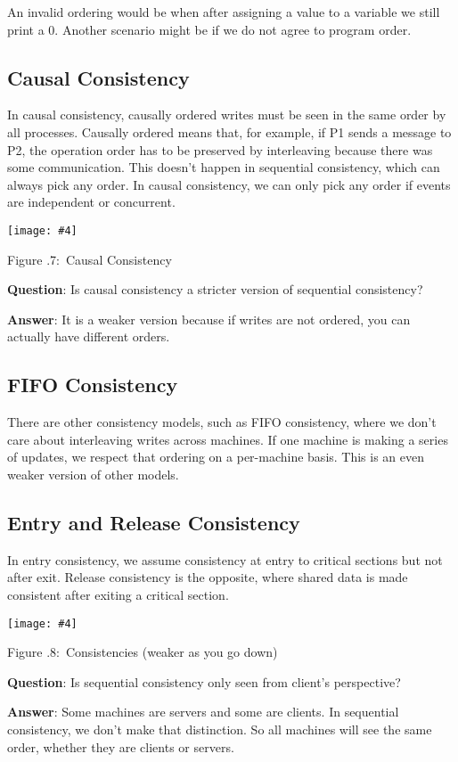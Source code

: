 \documentclass[twoside]{article}
\newcounter{lecnum}
\newcommand{\fig}[4]{
            \centerline{\texttt{[image: \#4]}}
            \begin{center}
            Figure \thelecnum.#1:~#3
            \end{center}
    }
\begin{document}
An invalid ordering would be when after assigning a value to a variable we still print a 0. Another scenario might be if we do not agree to program order.

\subsection{Causal Consistency}

In causal consistency, causally ordered writes must be seen in the same order by all processes. Causally ordered means that, for example, if P1 sends a message to P2, the operation order has to be preserved by interleaving because there was some communication. This doesn't happen in sequential consistency, which can always pick any order. In causal consistency, we can only pick any order if events are independent or concurrent.

\fig{7}{0.3}{Causal Consistency}{causal}

\textbf{Question}: Is causal consistency a stricter version of sequential consistency?

\textbf{Answer}: It is a weaker version because if writes are not ordered, you can actually have different orders.

\subsection{FIFO Consistency}

There are other consistency models, such as FIFO consistency, where we don't care about interleaving writes across machines. If one machine is making a series of updates, we respect that ordering on a per-machine basis. This is an even weaker version of other models.

\subsection{Entry and Release Consistency}

In entry consistency, we assume consistency at entry to critical sections but not after exit. Release consistency is the opposite, where shared data is made consistent after exiting a critical section.

\fig{8}{0.3}{Consistencies (weaker as you go down)}{order}

\textbf{Question}: Is sequential consistency only seen from client's perspective?

\textbf{Answer}: Some machines are servers and some are clients. In sequential consistency, we don't make that distinction. So all machines will see the same order, whether they are clients or servers.
\end{document}
